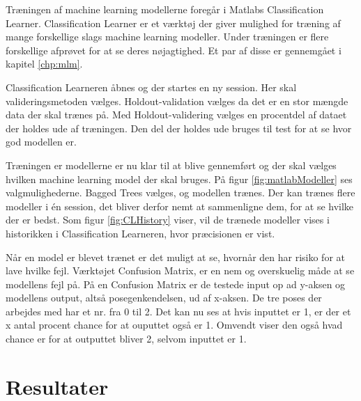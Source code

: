 Træningen af machine learning modellerne foregår i Matlabs Classification Learner\citep{matlabClassificationLearner}. Classification Learner er et værktøj der giver mulighed for træning af mange forskellige slags machine learning modeller. Under træningen er flere forskellige afprøvet for at se deres nøjagtighed. Et par af disse er gennemgået i kapitel \ref{chp:mlm}.

Classification Learneren åbnes og der startes en ny session. Her skal valideringsmetoden vælges. Holdout-validation vælges da det er en stor mængde data der skal trænes på. Med Holdout-validering vælges en procentdel af dataet der holdes ude af træningen. Den del der holdes ude bruges til test for at se hvor god modellen er\citep{matlabValidation}.



Træningen er modellerne er nu klar til at blive gennemført og der skal vælges hvilken machine learning model der skal bruges. På figur \ref{fig:matlabModeller} ses valgmulighederne.
Bagged Trees vælges, og modellen trænes.
Der kan trænes flere modeller i én session, det bliver derfor nemt at sammenligne dem, for at se hvilke der er bedst. Som figur \ref{fig:CLHistory} viser, vil de trænede modeller vises i historikken i Classification Learneren, hvor præcisionen er vist.

Når en model er blevet trænet er det muligt at se, hvornår den har risiko for at lave hvilke fejl. Værktøjet Confusion Matrix, er en nem og overskuelig måde at se modellens fejl på. På en Confusion Matrix er de testede input op ad y-aksen og modellens output, altså posegenkendelsen, ud af x-aksen. De tre poses der arbejdes med har et nr. fra 0 til 2. Det kan nu ses at hvis inputtet er 1, er der et x antal procent chance for at ouputtet også er 1. Omvendt viser den også hvad chance er for at outputtet bliver 2, selvom inputtet er 1.


\section{Resultater}